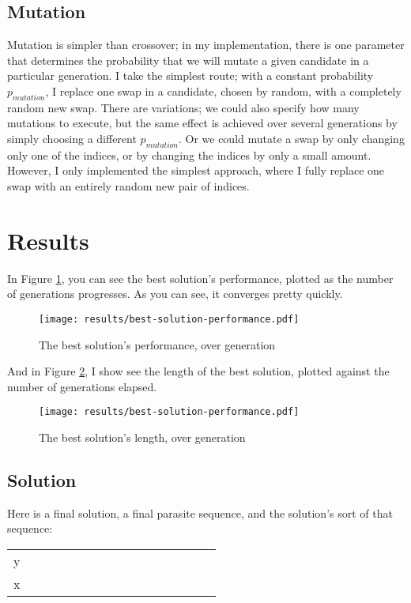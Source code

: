 \documentclass[11pt]{report}
\begin{document}
\subsection{Mutation}
Mutation is simpler than crossover; in my implementation, there is one parameter that determines the probability that we will mutate a given candidate in a particular generation. I take the simplest route; with a constant probability $p_{mutation}$, I replace one swap in a candidate, chosen by random, with a completely random new swap. There are variations; we could also specify how many mutations to execute, but the same effect is achieved over several generations by simply choosing a different $p_{mutation}$. Or we could mutate a swap by only changing only one of the indices, or by changing the indices by only a small amount. However, I only implemented the simplest approach, where I fully replace one swap with an entirely random new pair of indices.

\section{Results}

In Figure \ref{fig:best-solution-performance}, you can see the best solution's performance, plotted as the number of generations progresses. As you can see, it converges pretty quickly.

\begin{figure}[H]
  \centering
  \texttt{[image: results/best-solution-performance.pdf]}
  \caption{The best solution's performance, over generation}
  \label{fig:best-solution-performance}
\end{figure}

\noindent
And in Figure \ref{fig:best-solution-length}, I show see the length of the best solution, plotted against the number of generations elapsed.

\begin{figure}[H]
  \centering
  \texttt{[image: results/best-solution-performance.pdf]}
  \caption{The best solution's length, over generation}
  \label{fig:best-solution-length}
\end{figure}

\subsection{Solution}

Here is a final solution, a final parasite sequence, and the solution's sort of that sequence:

\begin{tabular}{cccccccccccccccc}
  y \\
  x \\
\end{tabular}




\end{document}

